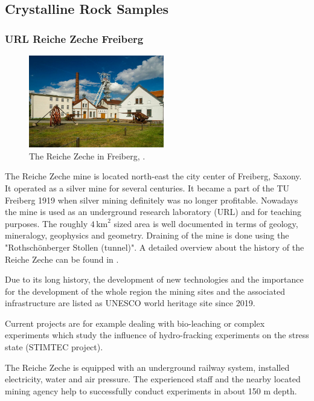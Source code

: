 \subsection{Crystalline Rock Samples}
\label{subsec:crystalline}

\subsubsection{URL Reiche Zeche Freiberg}


\begin{figure}
\centering
\includegraphics[width=5.9cm]{figures/reiche-zeche.jpg}
\caption{The Reiche Zeche in Freiberg, \cite{ReicheZechePicture}.}
\end{figure}
The Reiche Zeche mine is located north-east the city center of Freiberg, Saxony. It operated as a silver mine for several centuries. It became a part of the TU Freiberg 1919 when silver mining definitely was no longer profitable. Nowadays the mine is used as an underground research laboratory (URL) and for teaching purposes. The roughly $4\,\text{km}^2$ sized area is well documented in terms of geology, mineralogy, geophysics and geometry. Draining of the mine is done using the "Rothsch\"onberger Stollen (tunnel)". A detailed overview about the history of the Reiche Zeche can be found in \cite{ReicheZecheHistory}.

Due to its long history, the development of new technologies and the importance for the development of the whole region the mining sites and the associated infrastructure are listed as UNESCO world heritage site since 2019.

Current projects are for example dealing with bio-leaching or complex experiments which study the influence of hydro-fracking experiments on the stress state (STIMTEC project).

The Reiche Zeche is equipped with an underground railway system, installed electricity, water and air pressure. The experienced staff and the nearby located mining agency help to successfully conduct experiments in about 150 m depth. 

